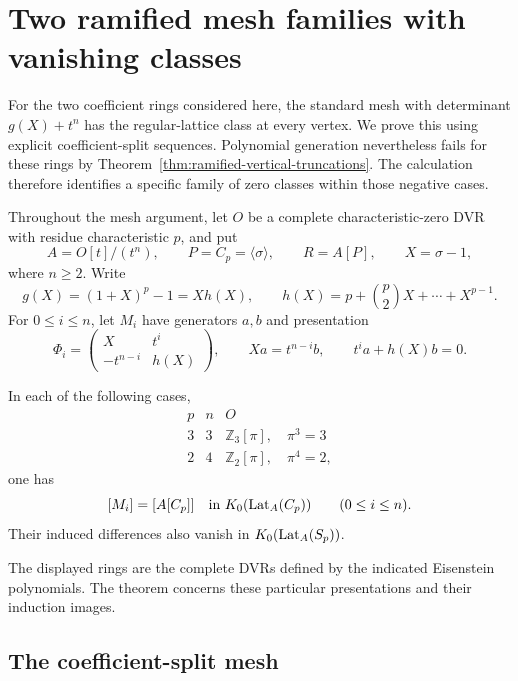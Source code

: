 \section{Two ramified mesh families with vanishing classes}
\label{sec:pure-power-vanishing}

For the two coefficient rings considered here, the standard mesh
with determinant \(g(X)+t^n\) has the regular-lattice class at every
vertex.  We prove this using explicit coefficient-split sequences.
Polynomial generation nevertheless fails for these rings by
Theorem~\ref{thm:ramified-vertical-truncations}.  The calculation
therefore identifies a specific family of zero classes within those
negative cases.

Throughout the mesh argument, let \(O\) be a complete
characteristic-zero DVR with residue characteristic \(p\), and put
\[
 A=O[t]/(t^n),\qquad P=C_p=\langle\sigma\rangle,
 \qquad R=A[P],\qquad X=\sigma-1,
\]
where \(n\ge2\).  Write
\[
 g(X)=(1+X)^p-1=Xh(X),\qquad
 h(X)=p+\binom p2X+\cdots+X^{p-1}.
\]
For \(0\le i\le n\), let \(M_i\) have generators \(a,b\) and
presentation
\begin{equation}\label{eq:pure-power-mesh-presentation}
 \Phi_i=\begin{pmatrix}X&t^i\\-t^{n-i}&h(X)\end{pmatrix},
 \qquad Xa=t^{n-i}b,\qquad t^ia+h(X)b=0.
\end{equation}

\begin{theorem}\label{thm:pure-power-mesh-vanishing}
In each of the following cases,
\[
 \begin{array}{c|c|c}
 p&n&O\\ \hline
 3&3&\mathbb Z_3[\pi],\quad\pi^3=3\\
 2&4&\mathbb Z_2[\pi],\quad\pi^4=2,
 \end{array}
\]
one has
\[
 [M_i]=[A[C_p]]\quad\text{in }K_0(\operatorname{Lat}_A(C_p))
 \qquad(0\le i\le n).
\]
Their induced differences also vanish in
\(K_0(\operatorname{Lat}_A(S_p))\).
\end{theorem}

The displayed rings are the complete DVRs defined by the indicated
Eisenstein polynomials.  The theorem concerns these particular
presentations and their induction images.

\subsection{The coefficient-split mesh}

